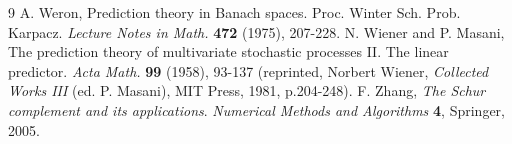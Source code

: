 \documentclass[11pt]{article}
\begin{document}
\begin{thebibliography}{9}
 A. Weron, Prediction theory in Banach spaces.  Proc. Winter Sch. Prob. Karpacz.  {\sl Lecture Notes in Math.} {\bf 472} (1975), 207-228.
 N. Wiener and P. Masani, The prediction theory of multivariate stochastic processes II. The linear predictor. {\sl Acta Math.} {\bf 99} (1958), 93-137 (reprinted, Norbert Wiener, {\sl Collected Works III} (ed. P. Masani), MIT Press, 1981, p.204-248). 
 F. Zhang, {\sl The Schur complement and its applications}.  {\sl Numerical Methods and Algorithms} {\bf 4}, Springer, 2005.
\end{thebibliography}
\end{document}
